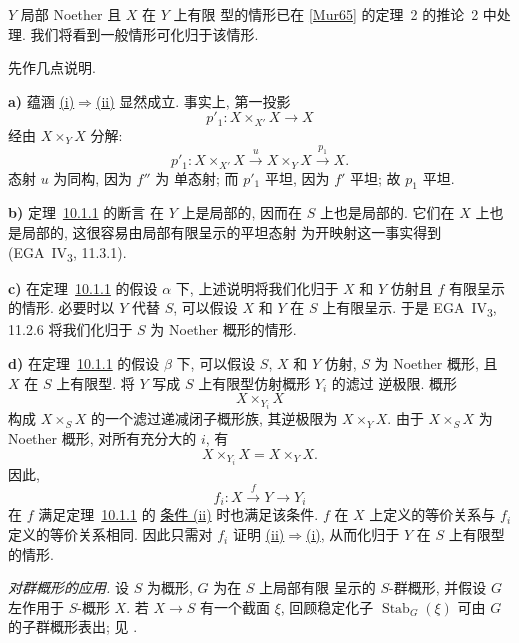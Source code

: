 \(Y\) 局部 Noether 且 \(X\) 在 \(Y\) 上有限
型的情形已在 \hyperref[bib:sga3-V-Mur65]{[Mur65]} 的定理~2 的推论~2 中处理.
我们将看到一般情形可化归于该情形.

先作几点说明.

\medskip
{}\label{par:sga3-V-10.1.1-a}%
\noindent\textbf{a)} 蕴涵 \hyperref[thm:sga3-V-10.1.1-i]{(i)}\(\Rightarrow\)\hyperref[thm:sga3-V-10.1.1-ii]{(ii)}
显然成立. 事实上, 第一投影
\[
  p'_1:X\times_{X'}X\longrightarrow X
\]
经由 \(X\times_Y X\) 分解:
\[
  p'_1:
  X\times_{X'}X\xrightarrow{\,u\,}X\times_Y X
  \xrightarrow{\,p_1\,}X.
\]
态射 \(u\) 为同构, 因为 \(f''\) 为
单态射; 而 \(p'_1\) 平坦, 因为 \(f'\) 平坦;
故 \(p_1\) 平坦.

\medskip
{}\label{par:sga3-V-10.1.1-b}%
\noindent\textbf{b)} 定理~\hyperref[thm:sga3-V-10.1.1]{10.1.1} 的断言
在 \(Y\) 上是局部的, 因而在 \(S\) 上也是局部的.
它们在 \(X\) 上也是局部的, 这很容易由局部有限呈示的平坦态射
为开映射这一事实得到
(EGA~IV\textsubscript{3}, 11.3.1).

\medskip
{}\label{par:sga3-V-10.1.1-c}%
\noindent\textbf{c)} 在定理~\hyperref[thm:sga3-V-10.1.1]{10.1.1} 的假设
\(\hyperref[thm:sga3-V-10.1.1-alpha]{\alpha}\) 下,
上述说明将我们化归于 \(X\) 和 \(Y\) 仿射且 \(f\)
有限呈示的情形. 必要时以 \(Y\) 代替 \(S\),
可以假设 \(X\) 和 \(Y\) 在 \(S\) 上有限呈示.
于是 EGA~IV\textsubscript{3}, 11.2.6 将我们化归于
\(S\) 为 Noether 概形的情形.

\medskip
{}\label{par:sga3-V-10.1.1-d}%
\noindent\textbf{d)} 在定理~\hyperref[thm:sga3-V-10.1.1]{10.1.1} 的假设
\(\hyperref[thm:sga3-V-10.1.1-beta]{\beta}\) 下,
可以假设 \(S\), \(X\) 和 \(Y\) 仿射, \(S\) 为 Noether 概形,
且 \(X\) 在 \(S\) 上有限型. 将 \(Y\) 写成
\(S\) 上有限型仿射概形 \(Y_i\) 的滤过
逆极限. 概形
\[
  X\times_{Y_i}X
\]
构成 \(X\times_S X\) 的一个滤过递减闭子概形族,
其逆极限为 \(X\times_Y X\). 由于
\(X\times_S X\) 为 Noether 概形, 对所有充分大的 \(i\),
有
\[
  X\times_{Y_i}X=X\times_Y X.
\]
因此,
\[
  f_i:X\xrightarrow{\,f\,}Y\longrightarrow Y_i
\]
在 \(f\) 满足定理~\hyperref[thm:sga3-V-10.1.1]{10.1.1} 的
\hyperref[thm:sga3-V-10.1.1-ii]{条件 (ii)} 时也满足该条件.
\(f\) 在 \(X\) 上定义的等价关系与
\(f_i\) 定义的等价关系相同. 因此只需对 \(f_i\) 证明
\hyperref[thm:sga3-V-10.1.1-ii]{(ii)}\(\Rightarrow\)\hyperref[thm:sga3-V-10.1.1-i]{(i)}, 从而化归于
\(Y\) 在 \(S\) 上有限型的情形.

\medskip
\noindent\textit{对群概形的应用.}
设 \(S\) 为概形, \(G\) 为在 \(S\) 上局部有限
呈示的 \(S\)-群概形, 并假设 \(G\) 左作用于
\(S\)-概形 \(X\). 若 \(X\to S\) 有一个截面 \(\xi\),
回顾稳定化子 \(\operatorname{Stab}_G(\xi)\) 可由
\(G\) 的子群概形表出; 见 .

